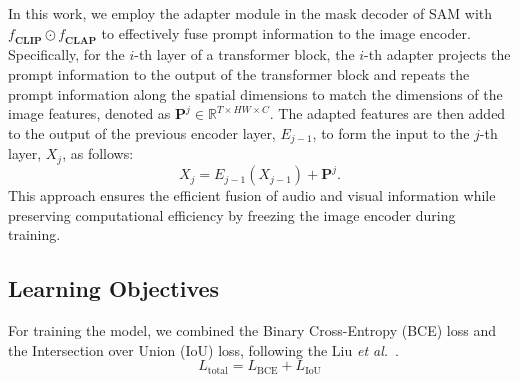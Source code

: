 In this work, we employ the adapter module in the mask decoder of SAM with $\mathbf{\textit{f}_{CLIP} \odot \textit{f}_{CLAP}}$ to effectively fuse prompt information to the image encoder. Specifically, for the $i$-th layer of a transformer block, the $i$-th adapter projects the prompt information to the output of the transformer block and repeats the prompt information along the spatial dimensions to match the dimensions of the image features, denoted as $\textbf{P}^j \in \mathbb{R}^{T \times HW \times C}$. The adapted features are then added to the output of the previous encoder layer, \(E_{j-1}\), to form the input to the \(j\)-th layer, \(X_j\), as follows:
\begin{equation}
    X_j = E_{j-1}(X_{j-1}) + \textbf{P}^j.
\end{equation}
This approach ensures the efficient fusion of audio and visual information while preserving computational efficiency by freezing the image encoder during training.



\subsection{Learning Objectives}
For training the model, we combined the Binary Cross-Entropy (BCE) loss and the Intersection over Union (IoU) loss, following the Liu \textit{et al.}~\cite{liu2024annotation}. 
\begin{equation}
    L_{\text{total}} = L_{\text{BCE}} + L_{\text{IoU}}
\end{equation}
